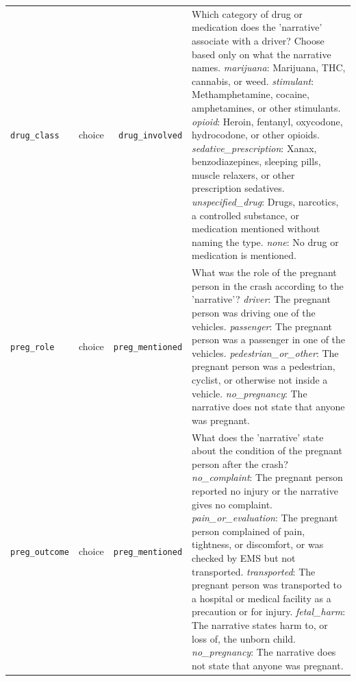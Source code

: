 \begin{small}
\begin{longtable}{lrr>{\raggedright\arraybackslash}p{267.2pt}}
\texttt{drug\_class} & choice & \texttt{drug\_involved} & Which category of drug or medication does the 'narrative' associate with a driver? Choose based only on what the narrative names. \newline \textit{marijuana}: Marijuana, THC, cannabis, or weed. \newline \textit{stimulant}: Methamphetamine, cocaine, amphetamines, or other stimulants. \newline \textit{opioid}: Heroin, fentanyl, oxycodone, hydrocodone, or other opioids. \newline \textit{sedative\_prescription}: Xanax, benzodiazepines, sleeping pills, muscle relaxers, or other prescription sedatives. \newline \textit{unspecified\_drug}: Drugs, narcotics, a controlled substance, or medication mentioned without naming the type. \newline \textit{none}: No drug or medication is mentioned. \\
\texttt{preg\_role} & choice & \texttt{preg\_mentioned} & What was the role of the pregnant person in the crash according to the 'narrative'? \newline \textit{driver}: The pregnant person was driving one of the vehicles. \newline \textit{passenger}: The pregnant person was a passenger in one of the vehicles. \newline \textit{pedestrian\_or\_other}: The pregnant person was a pedestrian, cyclist, or otherwise not inside a vehicle. \newline \textit{no\_pregnancy}: The narrative does not state that anyone was pregnant. \\
\texttt{preg\_outcome} & choice & \texttt{preg\_mentioned} & What does the 'narrative' state about the condition of the pregnant person after the crash? \newline \textit{no\_complaint}: The pregnant person reported no injury or the narrative gives no complaint. \newline \textit{pain\_or\_evaluation}: The pregnant person complained of pain, tightness, or discomfort, or was checked by EMS but not transported. \newline \textit{transported}: The pregnant person was transported to a hospital or medical facility as a precaution or for injury. \newline \textit{fetal\_harm}: The narrative states harm to, or loss of, the unborn child. \newline \textit{no\_pregnancy}: The narrative does not state that anyone was pregnant. \\

\end{longtable}
\end{small}

